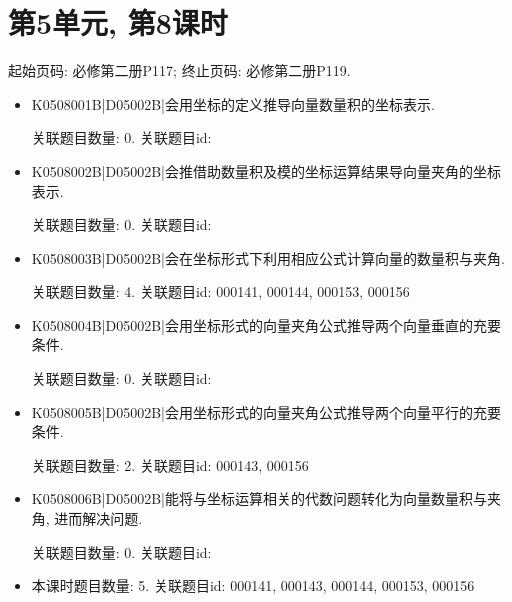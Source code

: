 \section*{第5单元, 第8课时}
起始页码: 必修第二册P117; 终止页码: 必修第二册P119.
\begin{itemize}
\item K0508001B|D05002B|会用坐标的定义推导向量数量积的坐标表示.

关联题目数量: 0. 关联题目id: 

\item K0508002B|D05002B|会推借助数量积及模的坐标运算结果导向量夹角的坐标表示.

关联题目数量: 0. 关联题目id: 

\item K0508003B|D05002B|会在坐标形式下利用相应公式计算向量的数量积与夹角.

关联题目数量: 4. 关联题目id: 000141, 000144, 000153, 000156

\item K0508004B|D05002B|会用坐标形式的向量夹角公式推导两个向量垂直的充要条件.

关联题目数量: 0. 关联题目id: 

\item K0508005B|D05002B|会用坐标形式的向量夹角公式推导两个向量平行的充要条件.

关联题目数量: 2. 关联题目id: 000143, 000156

\item K0508006B|D05002B|能将与坐标运算相关的代数问题转化为向量数量积与夹角, 进而解决问题.

关联题目数量: 0. 关联题目id: 

\item 本课时题目数量: 5. 关联题目id: 000141, 000143, 000144, 000153, 000156

\end{itemize}

